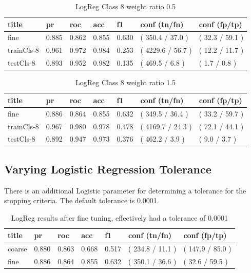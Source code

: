 \documentclass[ms]{nuthesis}
\begin{document}
\FloatBarrier
\begin{table}[H]
\centering
\begin{tabular}{|l||l||l||l||l||l||l|}\toprule
title & pr & roc & acc & f1 & conf (tn/fn) & conf (fp/tp) \\ \midrule
fine & 0.885 & 0.862 & 0.855 & 0.630 & ( 350.4 / 37.0 ) & ( 32.3 / 59.1 ) \\
trainCls-8 & 0.961 & 0.972 & 0.984 & 0.253 & ( 4229.6 / 56.7 ) & ( 12.2 / 11.7 ) \\
testCls-8 & 0.893 & 0.952 & 0.982 & 0.135 & ( 469.5 / 6.8 ) & ( 1.7 / 0.8 ) \\ \bottomrule
\end{tabular}
\caption{LogReg Class 8 weight ratio 0.5}
\label{tab:LogRegCls8-Wtp5}
\end{table}
\FloatBarrier

\FloatBarrier
\begin{table}[H]
\centering
\begin{tabular}{|l||l||l||l||l||l||l|}\toprule
title & pr & roc & acc & f1 & conf (tn/fn) & conf (fp/tp) \\ \midrule
fine & 0.886 & 0.864 & 0.855 & 0.632 & ( 349.5 / 36.4 ) & ( 33.2 / 59.7 ) \\
trainCls-8 & 0.967 & 0.980 & 0.978 & 0.478 & ( 4169.7 / 24.3 ) & ( 72.1 / 44.1 ) \\
testCls-8 & 0.892 & 0.947 & 0.973 & 0.376 & ( 462.2 / 3.9 ) & ( 9.0 / 3.7 ) \\ \bottomrule
\end{tabular}
\caption{LogReg Class 8 weight ratio 1.5}
\label{tab:LogRegCls8-Wt1p5}
\end{table}
\FloatBarrier

\subsection{Varying Logistic Regression Tolerance}
\par There is an additional Logistic parameter for determining a tolerance for the
stopping criteria. The default tolerance is 0.0001.

\FloatBarrier
\begin{table}[H]
\centering
\begin{tabular}{|l||l||l||l||l||l||l|}\toprule
title & pr & roc & acc & f1 & conf (tn/fn) & conf (fp/tp) \\ \midrule
coarse & 0.880 & 0.863 & 0.668 & 0.517 & ( 234.8 / 11.1 ) & ( 147.9 / 85.0 ) \\
fine & 0.886 & 0.864 & 0.855 & 0.632 & ( 350.1 / 36.6 ) & ( 32.6 / 59.5 ) \\ \bottomrule
\end{tabular}
\caption{LogReg results after fine tuning, effectively had a tolerance of 0.0001}
\label{tab:LogRegAftFineTune}
\end{table}
\FloatBarrier
\end{document}
